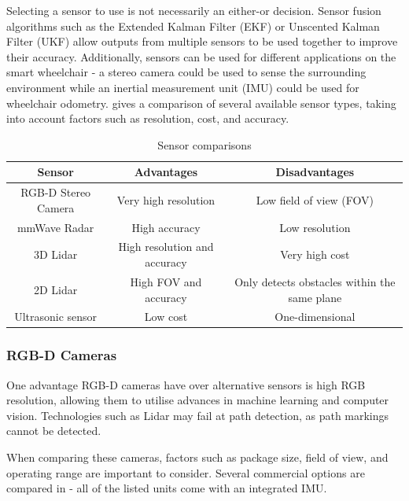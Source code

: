 \documentclass[12pt]{article}
\begin{document}
Selecting a sensor to use is not necessarily an either-or decision. Sensor fusion algorithms such as
the Extended Kalman Filter (EKF) or Unscented Kalman Filter (UKF) \cite{wanUnscentedKalmanFilter2000} allow
outputs from multiple sensors to be used together to improve their accuracy. Additionally, sensors can
be used for different applications on the smart wheelchair - a stereo camera could be used to sense the surrounding environment
while an inertial measurement unit (IMU) could be used for wheelchair odometry.
 gives a comparison of several available sensor types,
taking into account factors such as resolution, cost, and accuracy.

\begin{table}[H]
    \centering
\begin{adjustbox}{width=\textwidth}
    \begin{tabular}{c c c}
    \toprule
    Sensor & Advantages & Disadvantages \\
    \midrule
    RGB-D Stereo Camera & Very high resolution & Low field of view (FOV) \\
    mmWave Radar & High accuracy & Low resolution \\
    3D Lidar & High resolution and accuracy & Very high cost \\
    2D Lidar & High FOV and accuracy & Only detects obstacles within the same plane \\
    Ultrasonic sensor & Low cost & One-dimensional \\
    \bottomrule
    \end{tabular}
\end{adjustbox}
    \caption{Sensor comparisons}
    \label{table:sensor_options}
\end{table}


\subsubsection{RGB-D Cameras}
One advantage RGB-D cameras have over alternative sensors is high RGB resolution,
allowing them to utilise advances in machine learning and computer vision.
Technologies such as Lidar may fail at path detection, as path markings
cannot be detected.

When comparing these cameras, factors such as package size,
field of view, and operating range are important to consider.
Several commercial options are compared in 
- all of the listed units come with an integrated IMU.
\end{document}
